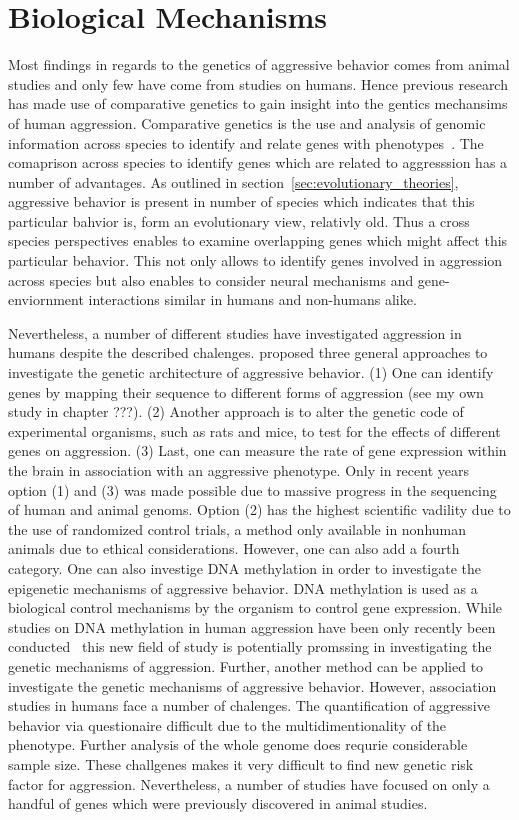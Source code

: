 \section{Biological Mechanisms}
\label{sec:biological_mechanisms}

Most findings in regards to the genetics of aggressive behavior comes from animal studies and only few have come from studies on humans.
Hence previous research has made use of comparative genetics to gain insight into the gentics mechansims of human aggression.
Comparative genetics is the use and analysis of genomic information across species to identify and relate genes with phenotypes~\cite{Maxson2003}.
The comaprison across species to identify genes which are related to aggresssion has a number of advantages.
As outlined in section~\ref{sec:evolutionary_theories}, aggressive behavior is present in number of species which indicates that this particular bahvior is, form an evolutionary view, relativly old.
Thus a cross species perspectives enables to examine overlapping genes which might affect this particular behavior.
This not only allows to identify genes involved in aggression across species but also enables to consider neural mechanisms and gene-enviornment interactions similar in humans and non-humans alike.

Nevertheless, a number of different studies have investigated aggression in humans despite the described chalenges.
\citet{Maxson2005} proposed three general approaches to investigate the genetic architecture of aggressive behavior.
(1) One can identify genes by mapping their sequence to different forms of aggression (see my own study in chapter ???).
(2) Another approach is to alter the genetic code of experimental organisms, such as rats and mice, to test for the effects of different genes on aggression.
(3) Last, one can measure the rate of gene expression within the brain in association with an aggressive phenotype.
Only in recent years option (1) and (3) was made possible due to massive progress in the sequencing of human and animal genoms.
Option (2) has the highest scientific vadility due to the use of randomized control trials, a method only available in nonhuman animals due to ethical considerations.
However, one can also add a fourth category.
One can also investige DNA methylation in order to investigate the epigenetic mechanisms of aggressive behavior.
DNA methylation is used as a biological control mechanisms by the organism to control gene expression.
While studies on DNA methylation in human aggression have been only recently been conducted~\cite{VanDongen2015a} this new field of study is potentially promssing in investigating the genetic mechanisms of aggression.
Further, another method can be applied to investigate the genetic mechanisms of aggressive behavior.
However, association studies in humans face a number of chalenges.
The quantification of aggressive behavior via questionaire difficult due to the multidimentionality of the phenotype.
Further analysis of the whole genome does requrie considerable sample size.
These challgenes makes it very difficult to find new genetic risk factor for aggression.
Nevertheless, a number of studies have focused on only a handful of genes which were previously discovered in animal studies.



